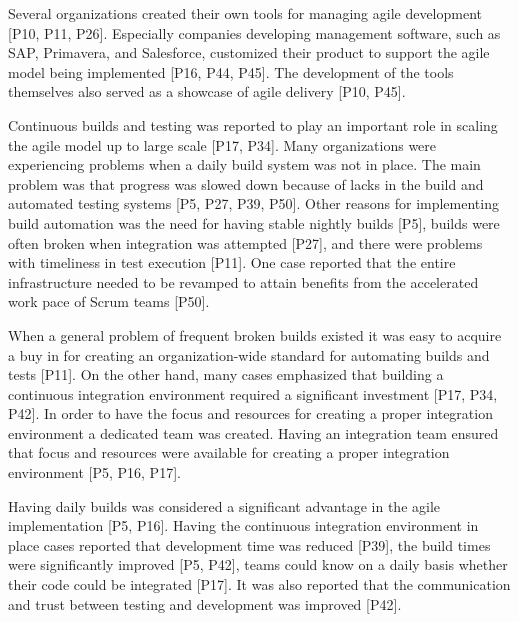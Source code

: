 Several organizations created their own tools for managing agile development
[P10, P11, P26]. Especially companies developing management software, such as
SAP, Primavera, and Salesforce, customized their product to support the agile
model being implemented [P16, P44, P45]. The development of the tools themselves
also served as a showcase of agile delivery [P10, P45].


Continuous builds and testing was reported to play an important role in scaling
the agile model up to large scale [P17, P34]. Many organizations were
experiencing problems when a daily build system was not in place. The main
problem was that progress was slowed down because of lacks in the build and
automated testing systems [P5, P27, P39, P50].
Other reasons for implementing build automation was the need for having stable
nightly builds [P5], builds were often broken when integration was attempted
[P27], and there were problems with timeliness in test execution [P11]. One case
reported that the entire infrastructure needed to be revamped to attain benefits
from the accelerated work pace of Scrum teams [P50].

When a general problem of frequent broken builds existed it was easy to acquire
a buy in for creating an organization-wide standard for automating builds and
tests [P11]. On the other hand, many cases emphasized that building a continuous
integration environment required a significant investment [P17, P34, P42].
In order to have the focus and resources for creating a proper integration
environment a dedicated team was created. Having an integration team ensured
that focus and resources were available for creating a proper integration
environment [P5, P16, P17].

Having daily builds was considered a significant advantage in the agile
implementation [P5, P16]. Having the continuous integration environment in place
cases reported that development time was reduced [P39], the build times were
significantly improved [P5, P42], teams could know on a daily basis whether
their code could be integrated [P17]. It was also reported that the
communication and trust between testing and development was improved [P42].


